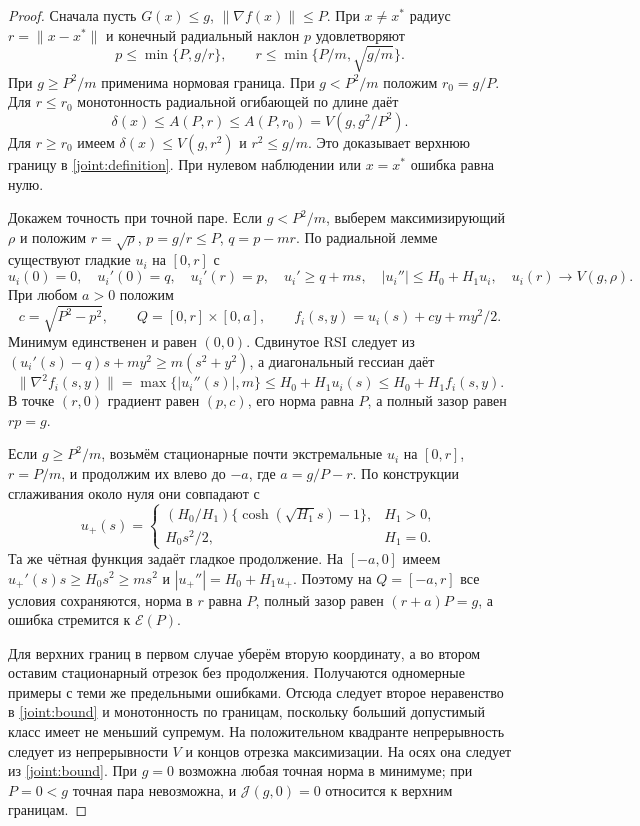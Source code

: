 \begin{proof}\label{joint:proof}
Сначала пусть $G(x)\le g$, $\|\nabla f(x)\|\le P$.
При $x\ne x^*$ радиус $r=\|x-x^*\|$ и конечный радиальный
наклон $p$ удовлетворяют
\[
 p\le\min\{P,g/r\},\qquad
 r\le\min\{P/m,\sqrt{g/m}\}.
\]
При $g\ge P^2/m$ применима нормовая граница.
При $g<P^2/m$ положим $r_0=g/P$.
Для $r\le r_0$ монотонность радиальной огибающей по длине даёт
\[
 \delta(x)\le A(P,r)\le A(P,r_0)=V(g,g^2/P^2).
\]
Для $r\ge r_0$ имеем $\delta(x)\le V(g,r^2)$ и $r^2\le g/m$.
Это доказывает верхнюю границу в \eqref{joint:definition}.
При нулевом наблюдении или $x=x^*$ ошибка равна нулю.

Докажем точность при точной паре. Если $g<P^2/m$, выберем
максимизирующий $\rho$ и положим
$r=\sqrt\rho$, $p=g/r\le P$, $q=p-mr$.
По радиальной лемме существуют гладкие $u_i$ на $[0,r]$ с
\[
 u_i(0)=0,\quad u_i'(0)=q,\quad u_i'(r)=p,\quad
 u_i'\ge q+ms,\quad |u_i''|\le H_0+H_1u_i,
 \quad u_i(r)\longrightarrow V(g,\rho).
\]
При любом $a>0$ положим
\[
 c=\sqrt{P^2-p^2},\qquad Q=[0,r]\times[0,a],\qquad
 f_i(s,y)=u_i(s)+cy+my^2/2.
\]
Минимум единственен и равен $(0,0)$. Сдвинутое RSI следует из
$(u_i'(s)-q)s+my^2\ge m(s^2+y^2)$, а диагональный гессиан даёт
\[
 \|\nabla^2f_i(s,y)\|
 =\max\{|u_i''(s)|,m\}\le H_0+H_1u_i(s)\le H_0+H_1f_i(s,y).
\]
В точке $(r,0)$ градиент равен $(p,c)$, его норма равна $P$,
а полный зазор равен $rp=g$.

Если $g\ge P^2/m$, возьмём стационарные почти экстремальные
$u_i$ на $[0,r]$, $r=P/m$, и продолжим их влево до
$-a$, где $a=g/P-r$. По конструкции сглаживания около нуля
они совпадают с
\[
 u_+(s)=
 \begin{cases}
 (H_0/H_1)\{\cosh(\sqrt{H_1}s)-1\},&H_1>0,\\
 H_0s^2/2,&H_1=0.
 \end{cases}
\]
Та же чётная функция задаёт гладкое продолжение.
На $[-a,0]$ имеем $u_+'(s)s\ge H_0s^2\ge ms^2$ и
$|u_+''|=H_0+H_1u_+$. Поэтому на $Q=[-a,r]$ все условия
сохраняются, норма в $r$ равна $P$, полный зазор равен
$(r+a)P=g$, а ошибка стремится к $\mathcal E(P)$.

Для верхних границ в первом случае уберём вторую координату,
а во втором оставим стационарный отрезок без продолжения.
Получаются одномерные примеры с теми же предельными ошибками.
Отсюда следует второе неравенство в \eqref{joint:bound} и
монотонность по границам, поскольку больший допустимый класс
имеет не меньший супремум. На положительном квадранте непрерывность
следует из непрерывности $V$ и концов отрезка максимизации.
На осях она следует из \eqref{joint:bound}.
При $g=0$ возможна любая точная норма в минимуме; при $P=0<g$
точная пара невозможна, и $\mathcal J(g,0)=0$ относится к
верхним границам.
\end{proof}

